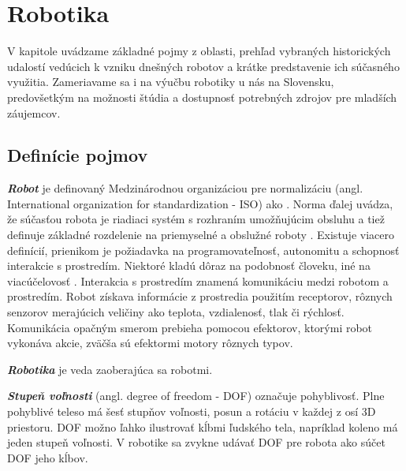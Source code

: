 \chapter{Robotika}

\label{kap:robotika}

V kapitole uvádzame základné pojmy z oblasti, prehľad vybraných historických udalostí vedúcich k vzniku dnešných robotov a krátke predstavenie ich súčasného využitia. Zameriavame sa i na výučbu robotiky u nás na Slovensku, predovšetkým na možnosti štúdia a dostupnosť potrebných zdrojov pre mladších záujemcov.

\section{Definície pojmov}
\textbf{\textit{Robot}} je definovaný Medzinárodnou organizáciou pre normalizáciu (angl. International organization for standardization - ISO) ako . Norma ďalej uvádza, že súčasťou robota je riadiaci systém s rozhraním umožňujúcim obsluhu a tiež definuje základné rozdelenie na priemyselné a obslužné roboty \cite{ISORobot}. Existuje viacero definícií, prienikom je požiadavka na programovateľnosť, autonomitu a schopnosť interakcie s prostredím. Niektoré kladú dôraz na podobnosť človeku, iné na viacúčelovosť \cite{RoboticsAndAutomationHandbook}. Interakcia s prostredím znamená komunikáciu medzi robotom a prostredím. Robot získava informácie z prostredia použitím receptorov, rôznych senzorov merajúcich veličiny ako teplota, vzdialenosť, tlak či rýchlosť. Komunikácia opačným smerom prebieha pomocou efektorov, ktorými robot vykonáva akcie, zväčša sú efektormi motory rôznych typov.

\textbf{\textit{Robotika}} je veda zaoberajúca sa robotmi.

\textbf{\textit{Stupeň voľnosti}} (angl. degree of freedom - DOF) označuje pohyblivosť. Plne pohyblivé teleso má šesť stupňov voľnosti, posun a rotáciu v každej z osí 3D priestoru. DOF možno ľahko ilustrovať kĺbmi ľudského tela, napríklad koleno má jeden stupeň voľnosti. V robotike sa zvykne udávať DOF pre robota ako súčet DOF jeho kĺbov.


